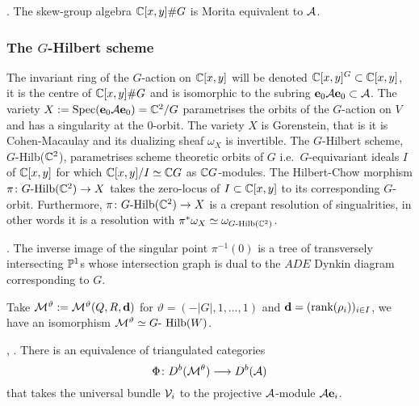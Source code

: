 \documentclass{amsart}
\theoremstyle{definition}
\begin{document}
\begin{theorem}\cite{MR2593679}.
The skew-group algebra $\mathbb{C}[x,y] \# G$ is Morita equivalent to $\mathcal{A}$.
\end{theorem}

\subsubsection{The $G$-Hilbert scheme}

The invariant ring of the $G$-action on $\mathbb{C}[x,y]$ will be denoted $\mathbb{C}[x,y]^G \subset \mathbb{C}[x,y]$, it is the centre of $\mathbb{C}[x,y] \# G$ and is isomorphic to the subring $\mathbf{e}_0 \mathcal{A} \mathbf{e}_0 \subset \mathcal{A}$.
The variety $X:= \operatorname{Spec}(\mathbf{e}_0 \mathcal{A} \mathbf{e}_0)=\mathbb{C}^2/G$ parametrises the orbits of the $G$-action on $V$ and has a singularity at the $0$-orbit.
The variety $X$ is Gorenstein, that is it is Cohen-Macaulay and its dualizing sheaf $\omega_X$ is invertible.
The $G$-Hilbert scheme, $G$-Hilb($\mathbb{C}^2$), parametrises scheme theoretic orbits of $G$ i.e.\ $G$-equivariant ideals $I$ of $\mathbb{C}[x,y]$ for which $\mathbb{C}[x,y]/I \simeq \mathbb{C} G$ as $\mathbb{C} G$-modules.
The Hilbert-Chow morphism $\pi \colon G\text{-Hilb}(\mathbb{C}^2) \rightarrow X$ takes the zero-locus of $I \subset \mathbb{C}[x,y]$ to its corresponding $G$-orbit.
Furthermore, $\pi \colon G\text{-Hilb}(\mathbb{C}^2) \rightarrow X$ is a crepant resolution of singualrities, in other words it is a resolution with $\pi^*\omega_X \simeq \omega_{G\text{-Hilb}(\mathbb{C}^2)}$.

\begin{theorem}\cite{MR604577}.
The inverse image of the singular point $\pi^{-1}(0)$ is a tree of transversely intersecting $\mathbb{P}^1$s whose intersection graph is dual to the $ADE$ Dynkin diagram corresponding to $G$.
\end{theorem}

Take $\mathcal{M}^\vartheta:=\mathcal{M}^\vartheta(Q,R,\mathbf{d})$ for $\vartheta = (-|G|,1, \ldots, 1)$ and $\mathbf{d}=(\text{rank}(\rho_i))_{i \in I}$, we have an isomorphism $\mathcal{M}^\vartheta \simeq G\text{- Hilb}(W)$.

\begin{theorem}\cite{MR740077}, \cite{MR1752785}.
There is an equivalence of triangulated categories $$\Phi \colon D^b(\mathcal{M}^\theta) \longrightarrow D^b(\mathcal{A})$$ that takes the universal bundle $\mathcal{V}_i$ to the projective $\mathcal{A}$-module $\mathcal{A}\mathbf{e}_i$.
\end{theorem}
\end{document}
